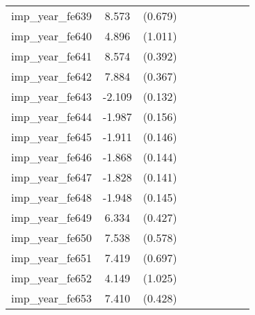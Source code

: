 {\begin{tabular}{l*{4}{cc}}
imp\_year\_fe639&    8.573\sym{***}&  (0.679)&                  &         &                  &         &                  &         \\
imp\_year\_fe640&    4.896\sym{***}&  (1.011)&                  &         &                  &         &                  &         \\
imp\_year\_fe641&    8.574\sym{***}&  (0.392)&                  &         &                  &         &                  &         \\
imp\_year\_fe642&    7.884\sym{***}&  (0.367)&                  &         &                  &         &                  &         \\
imp\_year\_fe643&   -2.109\sym{***}&  (0.132)&                  &         &                  &         &                  &         \\
imp\_year\_fe644&   -1.987\sym{***}&  (0.156)&                  &         &                  &         &                  &         \\
imp\_year\_fe645&   -1.911\sym{***}&  (0.146)&                  &         &                  &         &                  &         \\
imp\_year\_fe646&   -1.868\sym{***}&  (0.144)&                  &         &                  &         &                  &         \\
imp\_year\_fe647&   -1.828\sym{***}&  (0.141)&                  &         &                  &         &                  &         \\
imp\_year\_fe648&   -1.948\sym{***}&  (0.145)&                  &         &                  &         &                  &         \\
imp\_year\_fe649&    6.334\sym{***}&  (0.427)&                  &         &                  &         &                  &         \\
imp\_year\_fe650&    7.538\sym{***}&  (0.578)&                  &         &                  &         &                  &         \\
imp\_year\_fe651&    7.419\sym{***}&  (0.697)&                  &         &                  &         &                  &         \\
imp\_year\_fe652&    4.149\sym{***}&  (1.025)&                  &         &                  &         &                  &         \\
imp\_year\_fe653&    7.410\sym{***}&  (0.428)&                  &         &                  &         &                  &         \\

\end{tabular}}
